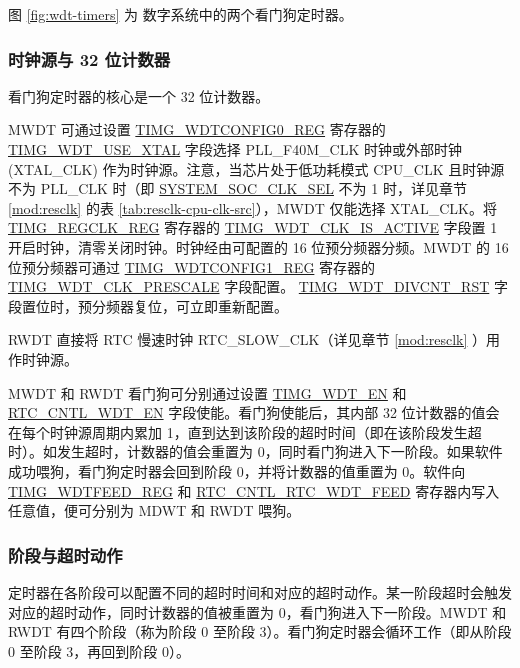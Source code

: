 \documentclass[main\_\_CN.tex]{subfiles}
\begin{document}
图 \ref{fig:wdt-timers} 为 \chipname{} 数字系统中的两个看门狗定时器。

\subsubsection{时钟源与 32 位计数器}

看门狗定时器的核心是一个 32 位计数器。


MWDT 可通过设置 \hyperref[regdesc:TIMGWDTCONFIG0REG]{TIMG\_WDTCONFIG0\_REG} 寄存器的 \hyperref[fielddesc:TIMGWDTUSEXTAL]{TIMG\_WDT\_USE\_XTAL} 字段选择 PLL\_F40M\_CLK 时钟或外部时钟 (XTAL\_CLK) 作为时钟源。注意，当芯片处于低功耗模式 CPU\_CLK 且时钟源不为 PLL\_CLK 时（即 \hyperref[fielddesc:SYSTEMSOCCLKSEL]{SYSTEM\_SOC\_CLK\_SEL} 不为 1 时，详见章节 \ref{mod:resclk} \textit{} 的表 \ref{tab:resclk-cpu-clk-src}），MWDT 仅能选择 XTAL\_CLK。将 \hyperref[regdesc:TIMGREGCLKREG]{TIMG\_REGCLK\_REG} 寄存器的 \hyperref[fielddesc:TIMGWDTCLKISACTIVE]{TIMG\_WDT\_CLK\_IS\_ACTIVE} 字段置 1 开启时钟，清零关闭时钟。时钟经由可配置的 16 位预分频器分频。MWDT 的 16 位预分频器可通过 \hyperref[regdesc:TIMGWDTCONFIG1REG]{TIMG\_WDTCONFIG1\_REG} 寄存器的 \hyperref[fielddesc:TIMGWDTCLKPRESCALE]{TIMG\_WDT\_CLK\_PRESCALE} 字段配置。 \hyperref[fielddesc:TIMGWDTDIVCNTRST]{TIMG\_WDT\_DIVCNT\_RST} 字段置位时，预分频器复位，可立即重新配置。


RWDT 直接将 RTC 慢速时钟 RTC\_SLOW\_CLK（详见章节 \ref{mod:resclk} \textit{}）用作时钟源。

MWDT 和 RWDT 看门狗可分别通过设置 \hyperref[fielddesc:TIMGWDTEN]{TIMG\_WDT\_EN} 和 \hyperref[fielddesc:RTCCNTLWDTEN]{RTC\_CNTL\_WDT\_EN} 字段使能。看门狗使能后，其内部 32 位计数器的值会在每个时钟源周期内累加 1，直到达到该阶段的超时时间（即在该阶段发生超时）。如发生超时，计数器的值会重置为 0，同时看门狗进入下一阶段。如果软件成功喂狗，看门狗定时器会回到阶段 0，并将计数器的值重置为 0。软件向 \hyperref[regdesc:TIMGWDTFEEDREG]{TIMG\_WDTFEED\_REG} 和 \hyperref[fielddesc:RTCCNTLWDTFEED]{RTC\_CNTL\_RTC\_WDT\_FEED} 寄存器内写入任意值，便可分别为 MDWT 和 RWDT 喂狗。


\subsubsection{阶段与超时动作}\label{sec:wdt-timeout}
定时器在各阶段可以配置不同的超时时间和对应的超时动作。某一阶段超时会触发对应的超时动作，同时计数器的值被重置为 0，看门狗进入下一阶段。MWDT 和 RWDT 有四个阶段（称为阶段 0 至阶段 3）。看门狗定时器会循环工作（即从阶段 0 至阶段 3，再回到阶段 0）。
\end{document}
